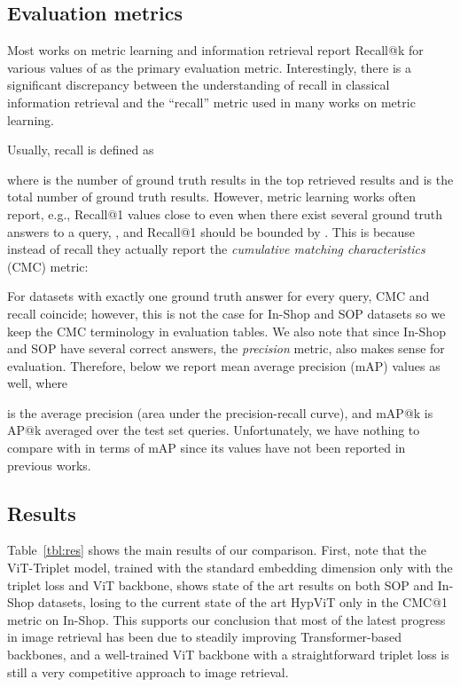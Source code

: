\documentclass{article}
\begin{document}
\subsection{Evaluation metrics}

\def\ntopk{n_{\mathrm{k}}}
\def\ngt{n_{\mathrm{gt}}}

Most works on metric learning and information retrieval report Recall@k for various values of  as the primary evaluation metric. Interestingly, there is a significant discrepancy between the understanding of recall in classical information retrieval and the ``recall'' metric used in many works on metric learning. 

Usually, recall is defined as 
 
where  is the number of ground truth results in the top  retrieved results and  is the total number of ground truth results. However, metric learning works often report, e.g., Recall@1 values close to  even when there exist several ground truth answers to a query, , and Recall@1 should be bounded by . This is because instead of recall they actually report the \emph{cumulative matching characteristics} (CMC) metric: 


For datasets with exactly one ground truth answer for every query, CMC and recall coincide; however, this is not the case for In-Shop and SOP datasets so we keep the CMC terminology in evaluation tables. We also note that since In-Shop and SOP have several correct answers, the \emph{precision} metric, 
 also makes sense for evaluation. Therefore, below we report mean average precision (mAP) values as well, where
 
is the average precision (area under the precision-recall curve), and mAP@k is AP@k averaged over the test set queries.  
Unfortunately, we have nothing to compare with in terms of mAP since its values have not been reported in previous works.

\subsection{Results}

Table~\ref{tbl:res} shows the main results of our comparison. First, note that the ViT-Triplet model, trained with the standard embedding dimension  only with the triplet loss and ViT backbone, shows state of the art results on both SOP and In-Shop datasets, losing to the current state of the art HypViT only in the CMC@1 metric on In-Shop. This supports our conclusion that most of the latest progress in image retrieval has been due to steadily improving Transformer-based backbones, and a well-trained ViT backbone with a straightforward triplet loss is still a very competitive approach to image retrieval.
\end{document}
